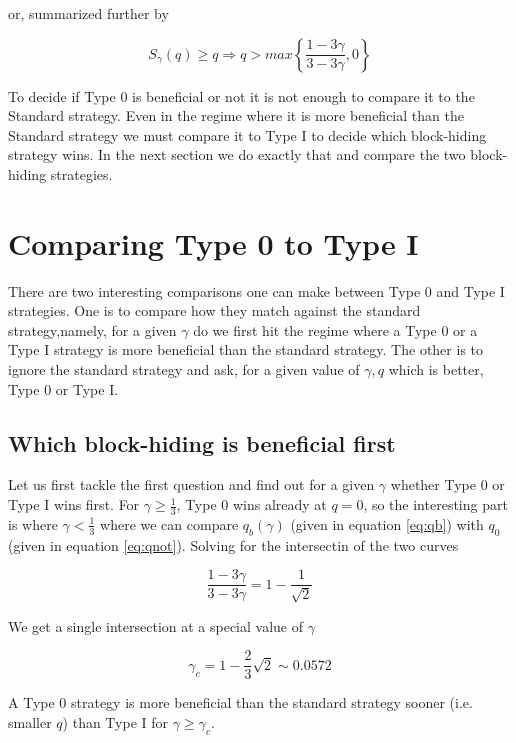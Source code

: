 \documentclass[letterpaper,12pt]{report}
\begin{document}
or, summarized further by 

\begin{equation}\label{eq:0overhonestsummary}
S_{\gamma}(q)\geq q \Longrightarrow
q>max\left\lbrace\dfrac{1-3\gamma}{3-3\gamma},0\right\rbrace
\end{equation}

To decide if Type 0 is beneficial or not it is not enough to compare it to the Standard strategy. Even in the regime where it is more beneficial than the Standard strategy we must compare it to Type I to decide which block-hiding strategy wins. In the next section we do exactly that and compare the two block-hiding strategies.

\section{Comparing Type 0 to Type I}

There are two interesting comparisons one can make between Type 0 and Type I strategies.
One is to compare how they match against the standard strategy,namely, for a given $\gamma$ do we first hit the regime where a Type 0 or a Type I strategy is more beneficial than the standard strategy.
The other is to ignore the standard strategy and ask, for a given value of $\gamma, q$ which is better, Type 0 or Type I.

\subsection{Which block-hiding is beneficial first}
Let us first tackle the first question and find out for a given $\gamma$ whether Type 0 or Type I wins first.
For $\gamma\geq\frac{1}{3}$, Type 0 wins already at $q=0$, so the interesting part is where $\gamma < \frac{1}{3}$ where we can compare $q_b(\gamma)$ (given in equation \ref{eq:qb}) with $q_0$ (given in equation \ref{eq:qnot}). Solving for the intersectin of the two curves

\begin{equation}\label{eq:qbornot}
\dfrac{1-3\gamma}{3-3\gamma}=1-\dfrac{1}{\sqrt{2}}
\end{equation}

We get a single intersection at a special value of $\gamma$

\begin{equation}\label{gamma0before1}
\gamma_c=1-\frac{2}{3}\sqrt{2}\sim 0.0572
\end{equation}

A Type 0 strategy is more beneficial than the standard strategy sooner (i.e. smaller $q$) than Type I for $\gamma \geq\gamma_c$.
\end{document}
